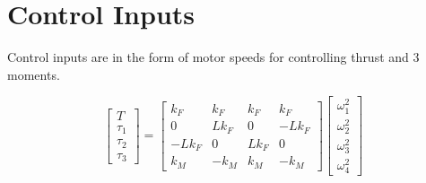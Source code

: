 \documentclass{article}
\begin{document}
\section{Control Inputs}

Control inputs are in the form of motor speeds for controlling thrust and 3 moments.
\vspace{10pt}

\[
\begin{bmatrix}
    T \\
    \tau_1 \\
    \tau_2 \\
    \tau_3
\end{bmatrix} = 
\begin{bmatrix}
    k_F & k_F & k_F & k_F \\
    0 & Lk_F & 0 & -Lk_F \\
    -Lk_F & 0 & Lk_F & 0 \\
    k_M & -k_M & k_M & -k_M
\end{bmatrix}
\begin{bmatrix}
    \omega_1^2 \\
    \omega_2^2 \\
    \omega_3^2 \\
    \omega_4^2
\end{bmatrix}
\]
\\
\end{document}
